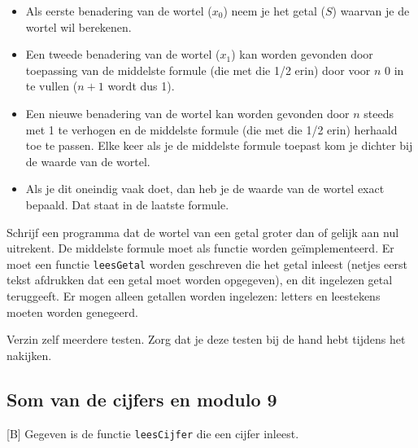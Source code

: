 \documentclass[a4paper,10pt,fleqn,twoside]{article}
\begin{document}
\begin{itemize}
\item Als eerste benadering van de wortel ($x_0$) neem je het getal ($S$) waarvan je de wortel wil berekenen.
\item Een tweede benadering van de wortel ($x_1$) kan worden gevonden door toepassing van de middelste formule (die met die 1/2 erin) door voor $n$ 0 in te vullen ($n+1$ wordt dus 1).
\item Een nieuwe benadering van de wortel kan worden gevonden door $n$ steeds met 1 te verhogen en de middelste formule (die met die 1/2 erin) herhaald toe te passen. Elke keer als je de middelste formule toepast kom je dichter bij de waarde van de wortel.
\item Als je dit oneindig vaak doet, dan heb je de waarde van de wortel exact bepaald. Dat staat in de laatste formule.
\end{itemize}

Schrijf een programma dat de wortel van een getal groter dan of gelijk aan nul uitrekent. De middelste formule moet als functie worden geïmplementeerd. Er moet een functie \lstinline|leesGetal| worden geschreven die het getal inleest (netjes eerst tekst afdrukken dat een getal moet worden opgegeven), en dit ingelezen getal teruggeeft. Er mogen alleen getallen worden ingelezen: letters en leestekens moeten worden genegeerd.

Verzin zelf meerdere testen. Zorg dat je deze testen bij de hand hebt tijdens het nakijken.

\subsection{Som van de cijfers en modulo 9}[B]
Gegeven is de functie \lstinline|leesCijfer| die een cijfer inleest. 

%
%
%
%    
\end{document}
